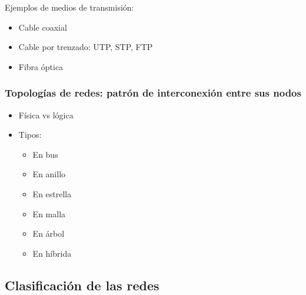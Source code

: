 \documentclass[a4paper,12pt]{article}
\begin{document}
Ejemplos de medios de transmisión:
\begin{itemize}
    \item Cable coaxial
    \item Cable por trenzado: UTP, STP, FTP
    \item Fibra óptica
\end{itemize}

\subsubsection*{Topologías de redes: patrón de interconexión entre sus nodos}

\begin{itemize}
    \item Física vs lógica
    \item Tipos:
    \begin{itemize}
        \item En bus 
        \item En anillo
        \item En estrella
        \item En malla
        \item En árbol
        \item En híbrida
    \end{itemize}
\end{itemize}

\subsection{Clasificación de las redes}
\end{document}
